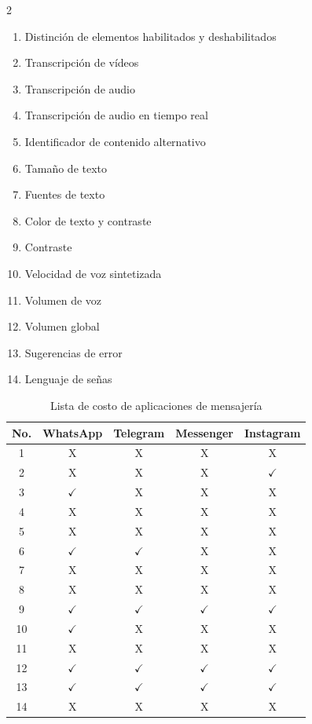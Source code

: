 \documentclass[lettersize,journal]{IEEEtran}
\begin{document}
\begin{itemize}
	\begin{multicols}{2}
		\begin{enumerate}
			\item Distinción de elementos habilitados y deshabilitados
			\item Transcripción de vídeos
			\item Transcripción de audio
			\item Transcripción de audio en tiempo real
			\item Identificador de contenido alternativo
			\item Tamaño de texto
			\item Fuentes de texto
			\item Color de texto y contraste
			\item Contraste
			\item Velocidad de voz sintetizada
			\item Volumen de voz
			\item Volumen global
			\item Sugerencias de error
			\item Lenguaje de señas
		\end{enumerate}
	\end{multicols}
	
	\begin{table}[ht]
		\centering
		\caption{Lista de costo de aplicaciones de mensajería}
		\label{tab:costo-aplicaciones}
		\begin{tabular}{|c|c|c|c|c|}
			\hline
			\textbf{No.} & \textbf{WhatsApp} & \textbf{Telegram} & \textbf{Messenger} & \textbf{Instagram} \\
			\hline
			1 & X & X & X & X \\
			\hline
			2 & X & X & X & $\checkmark$ \\
			\hline
			3 & $\checkmark$ & X & X & X \\
			\hline
			4 & X & X & X & X \\
			\hline
			5 & X & X & X & X \\
			\hline
			6 & $\checkmark$ & $\checkmark$ & X & X \\
			\hline
			7 & X & X & X & X \\
			\hline
			8 & X & X & X & X \\
			\hline
			9 & $\checkmark$ & $\checkmark$ & $\checkmark$ & $\checkmark$ \\
			\hline
			10 & $\checkmark$ & X & X & X \\
			\hline
			11 & X & X & X & X \\
			\hline
			12 & $\checkmark$ & $\checkmark$ & $\checkmark$ & $\checkmark$ \\
			\hline
			13 & $\checkmark$ & $\checkmark$ & $\checkmark$ & $\checkmark$ \\
			\hline
			14 & X & X & X & X \\
			\hline
		\end{tabular}
	\end{table}
	

\end{itemize}
\end{document}
